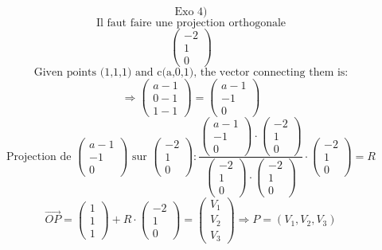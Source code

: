 \documentclass{article}
\begin{document}
\[ \text{Exo 4)} \]
\[ \text{Il faut faire une projection orthogonale} \]
\[ \begin{pmatrix} -2 \\ 1 \\ 0 \end{pmatrix} \]
\[ \text{Given points (1,1,1) and c(a,0,1), the vector connecting them is:} \]
\[ \Rightarrow \begin{pmatrix} a-1 \\ 0-1 \\ 1-1 \end{pmatrix} = \begin{pmatrix} a-1 \\ -1 \\ 0 \end{pmatrix} \]
\[ \text{Projection de } \begin{pmatrix} a-1 \\ -1 \\ 0 \end{pmatrix} \text{ sur } \begin{pmatrix} -2 \\ 1 \\ 0 \end{pmatrix}: \frac{\begin{pmatrix} a-1 \\ -1 \\ 0 \end{pmatrix} \cdot \begin{pmatrix} -2 \\ 1 \\ 0 \end{pmatrix}}{\begin{pmatrix} -2 \\ 1 \\ 0 \end{pmatrix} \cdot \begin{pmatrix} -2 \\ 1 \\ 0 \end{pmatrix}} \cdot \begin{pmatrix} -2 \\ 1 \\ 0 \end{pmatrix} = R \]
\[ \vec{OP} = \begin{pmatrix} 1 \\ 1 \\ 1 \end{pmatrix} + R \cdot \begin{pmatrix} -2 \\ 1 \\ 0 \end{pmatrix} = \begin{pmatrix} V_1 \\ V_2 \\ V_3 \end{pmatrix} \Rightarrow P = (V_1, V_2, V_3) \]
\end{document}
